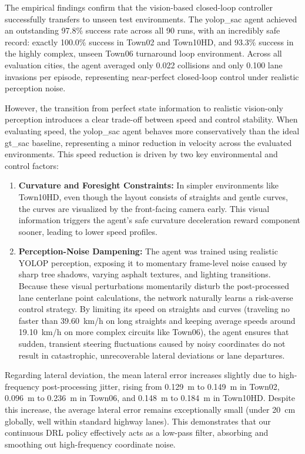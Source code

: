 \documentclass[sn-mathphys,Numbered]{sn-jnl}
\begin{document}
The empirical findings confirm that the vision-based closed-loop controller successfully transfers to unseen test environments. The yolop\_sac agent achieved an outstanding 97.8\% success rate across all 90 runs, with an incredibly safe record: exactly 100.0\% success in Town02 and Town10HD, and 93.3\% success in the highly complex, unseen Town06 turnaround loop environment. Across all evaluation cities, the agent averaged only 0.022 collisions and only 0.100 lane invasions per episode, representing near-perfect closed-loop control under realistic perception noise.

However, the transition from perfect state information to realistic vision-only perception introduces a clear trade-off between speed and control stability. When evaluating speed, the yolop\_sac agent behaves more conservatively than the ideal gt\_sac baseline, representing a minor reduction in velocity across the evaluated environments. This speed reduction is driven by two key environmental and control factors:
\begin{enumerate}
    \item \textbf{Curvature and Foresight Constraints:} In simpler environments like Town10HD, even though the layout consists of straights and gentle curves, the curves are visualized by the front-facing camera early. This visual information triggers the agent's safe curvature deceleration reward component sooner, leading to lower speed profiles.
    \item \textbf{Perception-Noise Dampening:} The agent was trained using realistic YOLOP perception, exposing it to momentary frame-level noise caused by sharp tree shadows, varying asphalt textures, and lighting transitions. Because these visual perturbations momentarily disturb the post-processed lane centerlane point calculations, the network naturally learns a risk-averse control strategy. By limiting its speed on straights and curves (traveling no faster than \SI{39.60}{km/h} on long straights and keeping average speeds around \SI{19.10}{km/h} on more complex circuits like Town06), the agent ensures that sudden, transient steering fluctuations caused by noisy coordinates do not result in catastrophic, unrecoverable lateral deviations or lane departures.
\end{enumerate}

Regarding lateral deviation, the mean lateral error increases slightly due to high-frequency post-processing jitter, rising from \SI{0.129}{\meter} to \SI{0.149}{\meter} in Town02, \SI{0.096}{\meter} to \SI{0.236}{\meter} in Town06, and \SI{0.148}{\meter} to \SI{0.184}{\meter} in Town10HD. Despite this increase, the average lateral error remains exceptionally small (under \SI{20}{cm} globally, well within standard highway lanes). This demonstrates that our continuous DRL policy effectively acts as a low-pass filter, absorbing and smoothing out high-frequency coordinate noise.
\end{document}
